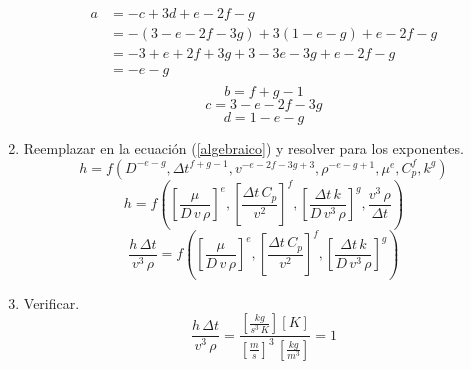 \begin{enumerate}
        \begin{equation*}
            \begin{split}
            a
                &= -c + 3d + e - 2f - g \\
                &= -(3 - e - 2f - 3g) + 3(1 - e - g) + e - 2f - g \\
                &= -3 + e + 2f + 3g + 3 - 3e - 3g + e - 2f - g \\
                &= -e - g \\
            \end{split}
        \end{equation*}
        \begin{equation*}
            b = f + g - 1
        \end{equation*}
        \begin{equation*}
            c = 3 -e - 2f - 3g
        \end{equation*}
        \begin{equation*}
            d = 1 - e -g
        \end{equation*}
    \item Reemplazar en la ecuación (\ref{algebraico}) y resolver para los
        exponentes.
        \begin{equation*}
            h = f(
                D^{-e-g},
                \Delta{t}^{f+g-1},
                v^{-e-2f-3g+3},
                \rho^{-e-g+1},
                \mu^e,C_p^f,k^g
            )
        \end{equation*}
        \begin{equation*}
            h = f\left(
                \left[\frac{\mu}{D\,v\,\rho}\right]^e,
                \left[\frac{\Delta{t}\,C_p}{v^2}\right]^f,
                \left[\frac{\Delta{t}\,k}{D\,v^3\,\rho}\right]^g,
                \frac{v^3\,\rho}{\Delta{t}}
            \right)
        \end{equation*}
        \begin{equation*}
            \frac{h\,\Delta{t}}{v^3\,\rho} = f\left(
                \left[\frac{\mu}{D\,v\,\rho}\right]^e,
                \left[\frac{\Delta{t}\,C_p}{v^2}\right]^f,
                \left[\frac{\Delta{t}\,k}{D\,v^3\,\rho}\right]^g
            \right)
        \end{equation*}
    \item Verificar.
        \begin{equation*}
            \frac{h\,\Delta{t}}{v^3\,\rho} =
            \dfrac{\left[\frac{kg}{s^3\,K}\right][K]}
            {\left[\frac{m}{s}\right]^3\,\left[\frac{kg}{m^3}\right]} = 1

\end{equation*}
\end{enumerate}
